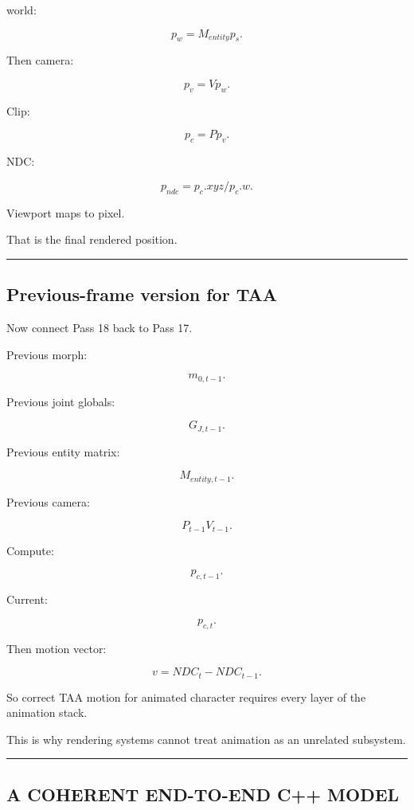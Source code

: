 world:

\[
\boxed{
p_w=
M_{entity}p_s.
}
\]

Then camera:

\[
p_v=
Vp_w.
\]

Clip:

\[
\boxed{
p_c=
Pp_v.
}
\]

NDC:

\[
p_{ndc}
=
p_c.xyz/p_c.w.
\]

Viewport maps to pixel.

That is the final rendered position.

\begin{center}\rule{0.5\linewidth}{0.5pt}\end{center}

\subsection{Previous-frame version for TAA}\label{04-visual-computing-ii-ch041-previous-frame-version-for-taa}

\hypertarget{04-visual-computing-ii-ch041-previous-frame-version-for-taa}{}

Now connect Pass 18 back to Pass 17.

Previous morph:

\[
m_{0,t-1}.
\]

Previous joint globals:

\[
G_{J,t-1}.
\]

Previous entity matrix:

\[
M_{entity,t-1}.
\]

Previous camera:

\[
P_{t-1}V_{t-1}.
\]

Compute:

\[
p_{c,t-1}.
\]

Current:

\[
p_{c,t}.
\]

Then motion vector:

\[
v=
NDC_t-NDC_{t-1}.
\]

So correct TAA motion for animated character requires every layer of the animation stack.

This is why rendering systems cannot treat animation as an unrelated subsystem.

\begin{center}\rule{0.5\linewidth}{0.5pt}\end{center}

\subsection{A COHERENT END-TO-END C++ MODEL}\label{04-visual-computing-ii-ch041-a-coherent-end-to-end-c-model}


